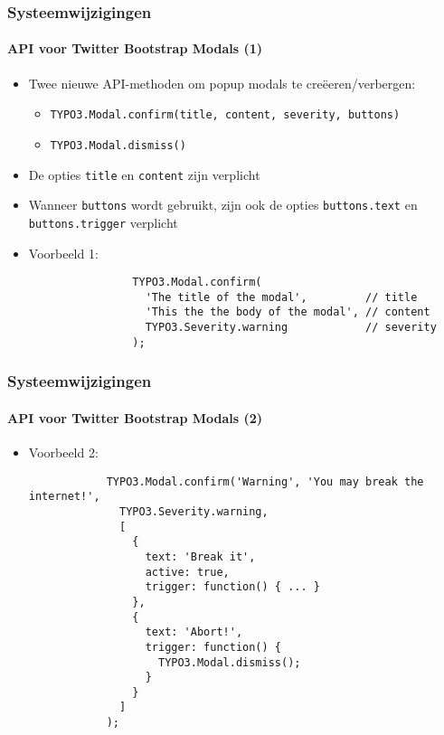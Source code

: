 \begin{frame}[fragile]
	\frametitle{Systeemwijzigingen}
	\framesubtitle{API voor Twitter Bootstrap Modals (1)}

	\lstset{basicstyle=\smaller\ttfamily}

	\begin{itemize}

		\item Twee nieuwe API-methoden om popup modals te creëeren/verbergen:
			\begin{itemize}
				\item \texttt{TYPO3.Modal.confirm(title, content, severity, buttons)}
				\item \texttt{TYPO3.Modal.dismiss()}
			\end{itemize}

		\item De opties \texttt{title} en \texttt{content} zijn verplicht
		\item Wanneer \texttt{buttons} wordt gebruikt, zijn ook de opties \texttt{buttons.text} en \texttt{buttons.trigger} verplicht

		\item Voorbeeld 1:

			\begin{lstlisting}
				TYPO3.Modal.confirm(
				  'The title of the modal',         // title
				  'This the the body of the modal', // content
				  TYPO3.Severity.warning            // severity
				);
			\end{lstlisting}

	\end{itemize}

\end{frame}


\begin{frame}[fragile]
	\frametitle{Systeemwijzigingen}
	\framesubtitle{API voor Twitter Bootstrap Modals (2)}

	\begin{itemize}

		\item Voorbeeld 2:

		\begin{lstlisting}
			TYPO3.Modal.confirm('Warning', 'You may break the internet!',
			  TYPO3.Severity.warning,
			  [
			    {
			      text: 'Break it',
			      active: true,
			      trigger: function() { ... }
			    },
			    {
			      text: 'Abort!',
			      trigger: function() {
			        TYPO3.Modal.dismiss();
			      }
			    }
			  ]
			);
		\end{lstlisting}

	\end{itemize}

\end{frame}

